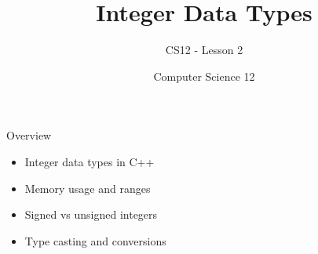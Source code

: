\documentclass[10pt]{beamer}
\title{Integer Data Types}
\subtitle{CS12 - Lesson 2}
\author{Computer Science 12}
\date{}
\begin{document}
\begin{frame}
    \titlepage
\end{frame}

\begin{frame}{Overview}
    \begin{itemize}
        \item Integer data types in C++
        \item Memory usage and ranges
        \item Signed vs unsigned integers
        \item Type casting and conversions
    \end{itemize}
\end{frame}

\end{document}
